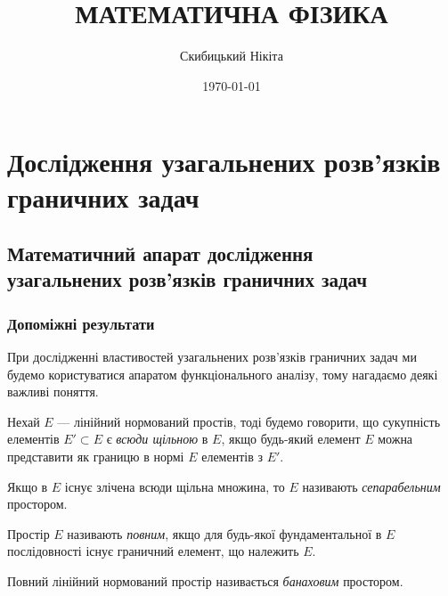 

\title{{\Huge МАТЕМАТИЧНА ФІЗИКА}}
\author{Скибицький Нікіта}
\date{\today}
 




\tableofcontents

\setcounter{section}{4}

\setcounter{section}{4}

\section{Дослідження узагальнених розв'язків \texorpdfstring{\\}{} граничних задач}

\subsection{Математичний апарат дослідження \texorpdfstring{\\}{} узагальнених розв'язків граничних задач}

\subsubsection{Допоміжні результати}

При дослідженні властивостей узагальнених розв'язків граничних задач ми будемо користуватися апаратом функціонального аналізу, тому нагадаємо деякі важливі поняття.

\begin{definition}
    Нехай $E$ --- лінійний нормований простів, тоді будемо говорити, що сукупність елементів $E' \subset E$ є \emph{всюди щільною} в $E$, якщо будь-який елемент $E$ можна представити як границю в нормі $E$ елементів з $E'$.
\end{definition}

\begin{definition}
    Якщо в $E$ існує злічена всюди щільна множина, то $E$ називають \emph{сепарабельним} простором.
\end{definition}

\begin{definition}
    Простір $E$ називають \emph{повним}, якщо для будь-якої фундаментальної в $E$ послідовності існує граничний елемент, що належить $E$.
\end{definition}

\begin{definition}
    Повний лінійний нормований простір називається \emph{банаховим} простором.
\end{definition}

